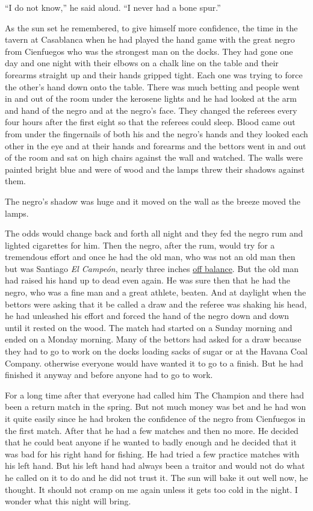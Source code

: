 \documentclass[fontset=ubuntu]{ctexrep}
\begin{document}
``I do not know,'' he said aloud. ``I never had a bone spur.''

As the sun set he remembered, to give himself more confidence, the time in
the \gls{tavern} at \gls{Casablanca} when he had played the hand game with
the great \gls{negro} from \gls{Cienfuegos} who was the strongest man on the
\glspl{dock}. They had gone one day and one night with their \glspl{elbow}
on a \gls{chalk} line on the table and their forearms straight up and their
hands gripped tight. Each one was trying to force the other's hand down onto
the table. There was much \gls{betting} and people went in and out of the
room under the \gls{kerosene} lights and he had looked at the arm and hand
of the negro and at the negro's face. They changed the \glspl{referee} every
four hours after the first eight so that the referees could sleep. Blood
came out from under the \glspl{fingernail} of both his and the negro's hands
and they looked each other in the eye and at their hands and forearms and
the \glspl{bettor} went in and out of the room and sat on high chairs
against the wall and watched. The walls were painted bright blue and were of
wood and the lamps \gls{threw} their shadows against them.

The negro's shadow was huge and it moved on the wall as the breeze moved the
lamps.

The \gls{odds} would change back and \gls{forth} all night and they fed the
negro \gls{rum} and lighted cigarettes for him. Then the negro, after the
rum, would try for a \gls{tremendous} effort and once he had the old man,
who was not an old man then but was Santiago \emph{El Campeón}, nearly three inches
\uline{off balance}. But the old man had raised his hand up to dead even again.
He was sure then that he had the negro, who was a fine man and a great
\gls{athlete}, beaten. And at daylight when the bettors were asking that it
be called a draw and the referee was shaking his head, he had unleashed his
effort and forced the hand of the negro down and down until it rested on the
wood. The match had started on a Sunday morning and ended on a Monday
morning. Many of the bettors had asked for a draw because they had to go to
work on the docks \gls{loading} sacks of sugar or at the Havana Coal Company.
\Gls{otherwise} everyone would have wanted it to go to a finish. But he had
finished it anyway and before anyone had to go to work.

For a long time after that everyone had called him The Champion and there
had been a return match in the spring. But not much money was bet and he had
won it quite easily since he had broken the confidence of the negro from
Cienfuegos in the first match. After that he had a few matches and then no
more. He decided that he could beat anyone if he wanted to \gls{badly}
enough and he decided that it was bad for his right hand for fishing. He had
tried a few practice matches with his left hand. But his left hand had
always been a \gls{traitor} and would not do what he called on it to do and
he did not trust it. The sun will \gls{bake} it out well now, he thought. It
should not cramp on me again unless it gets too cold in the night. I wonder
what this night will bring.
\end{document}

